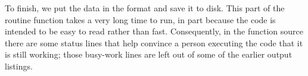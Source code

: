 To finish, we put the data in the  format and save it to 
disk.
This part of the routine function takes a very long time to run, in part because
the code is intended to be easy to read rather than fast.
Consequently, in the function source there are some status lines that
help convince a person executing the code that it is still working; 
those busy-work lines are left out of 
some of the earlier output listings.


\endinput


TODO:
1) mention Sage matrices are not mutable in matrix introduction.
Is mutable discussed in Intro?

2) Need int() fcns?  copy() fcn?